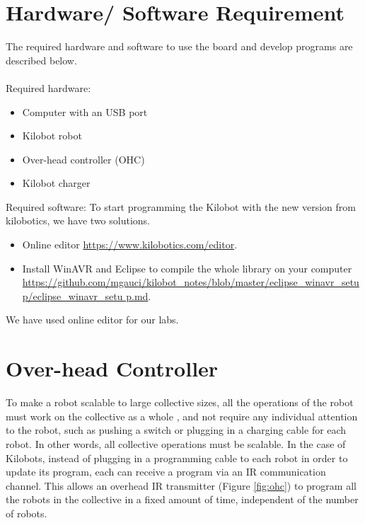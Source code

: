 \section{Hardware/ Software Requirement}
The required hardware and software to use the board and develop programs are described below.\\\\
Required hardware:
\begin{itemize}
\item Computer with an USB port
\item Kilobot robot
\item Over-head controller (OHC)
\item Kilobot charger
\end{itemize}

\noindent Required software:
To start programming the Kilobot with the new version from kilobotics, we  have two solutions.
\begin{itemize}
\item Online editor \url{https://www.kilobotics.com/editor}.
\item Install WinAVR and Eclipse to compile the whole library on your computer \url{https://github.com/mgauci/kilobot_notes/blob/master/eclipse_winavr_setup/eclipse_winavr_setu
p.md}. 
\end{itemize}
We have used online editor for our labs. 

\section{Over-head Controller}
To make a robot scalable to large collective sizes, all the operations of the robot must work on the collective as a whole \cite{mclurkin2006speaking}, and not require any individual attention to the robot, such as pushing a switch or plugging in a charging cable for each robot. In other words, all collective operations must be scalable. In the case of Kilobots, instead of plugging in a programming
cable to each robot in order to update its program, each can
receive a program via an IR communication channel.
This allows an overhead IR transmitter  (Figure \ref{fig:ohc}) to program all
the robots in the collective in a fixed amount of time, independent of the number of robots. 

